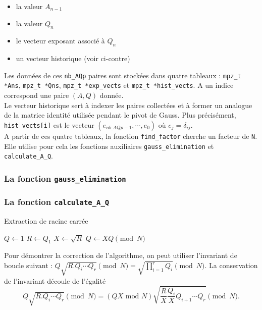 \begin{itemize}
    \item la valeur $A_{n-1}$
    \item la valeur $Q_n$
    \item le vecteur exposant associé à $Q_n$
    \item un vecteur historique (voir ci-contre) \end{itemize}

Les données de ces \texttt{nb\_AQp} paires sont stockées dans
quatre tableaux : \texttt{mpz\_t *Ans}, \texttt{mpz\_t *Qns}, 
\texttt{mpz\_t *exp\_vects} et \texttt{mpz\_t *hist\_vects}.
A un indice correspond une paire $(A,Q)$ donnée. \\

Le vecteur historique sert à indexer les paires collectées et à former
un analogue de la matrice identité utilisée pendant le pivot de Gauss. 
Plus précisément, \texttt{hist\_vects[i]} est le vecteur $(e_{nb\_AQp -1 }, 
\cdots, e_0)$ où $e_j = \delta_{ij}$.\\ 

A partir de ces quatre tableaux, la fonction \texttt{find\_factor} cherche 
un facteur de \texttt{N}. Elle utilise pour cela les fonctions auxiliaires 
\texttt{gauss\_elimination} et \texttt{calculate\_A\_Q}. 

\subsubsection{ La fonction \texttt{gauss\_elimination} }

\subsubsection{ La fonction \texttt{calculate\_A\_Q} }

\vspace{1em}
\begin{algorithm}[H]
\DontPrintSemicolon
\caption{Extraction de racine carrée}
$Q \gets 1$\;
$R \gets Q_1$\;
$X \gets \sqrt{R}$\;
    $Q \gets XQ \pmod{N}$\;
\;
\end{algorithm}
\vspace{1em}

Pour démontrer la correction de l'algorithme, on peut utiliser l'invariant de 
boucle suivant : $Q\sqrt{R.Q_i\cdots Q_r} \pmod{N} = \sqrt{\prod_{i=1}^r Q_{i}}
\pmod{N}$. La conservation de l'invariant découle de l'égalité
\[  Q\sqrt{R.Q_i\cdots Q_r} \pmod{N} = 
(QX\text{ mod }N) \sqrt{ \frac{R}{X}\frac{Q_i}{X}Q_{i+1} \cdots Q_r} \pmod{N}.\]

